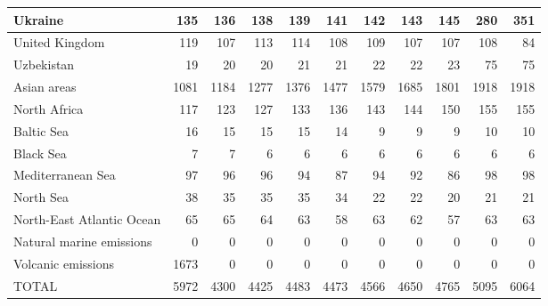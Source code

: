 \begin{table}
\begin{tabular}{|l|r|r|r|r|r|r|r|r|r|r|}
                       Ukraine&    135&    136&    138&    139&    141&    142&    143&    145&    280&    351\\\hline
                United Kingdom&    119&    107&    113&    114&    108&    109&    107&    107&    108&     84\\\hline
                    Uzbekistan&     19&     20&     20&     21&     21&     22&     22&     23&     75&     75\\\hline
                   Asian areas&   1081&   1184&   1277&   1376&   1477&   1579&   1685&   1801&   1918&   1918\\\hline
                  North Africa&    117&    123&    127&    133&    136&    143&    144&    150&    155&    155\\\hline
                    Baltic Sea&     16&     15&     15&     15&     14&      9&      9&      9&     10&     10\\\hline
                     Black Sea&      7&      7&      6&      6&      6&      6&      6&      6&      6&      6\\\hline
             Mediterranean Sea&     97&     96&     96&     94&     87&     94&     92&     86&     98&     98\\\hline
                     North Sea&     38&     35&     35&     35&     34&     22&     22&     20&     21&     21\\\hline
     North-East Atlantic Ocean&     65&     65&     64&     63&     58&     63&     62&     57&     63&     63\\\hline
      Natural marine emissions&      0&      0&      0&      0&      0&      0&      0&      0&      0&      0\\\hline
            Volcanic emissions&   1673&      0&      0&      0&      0&      0&      0&      0&      0&      0\\\hline\hline
                         TOTAL&   5972&   4300&   4425&   4483&   4473&   4566&   4650&   4765&   5095&   6064\\\hline
 \end{tabular}
 \end{table}
 
